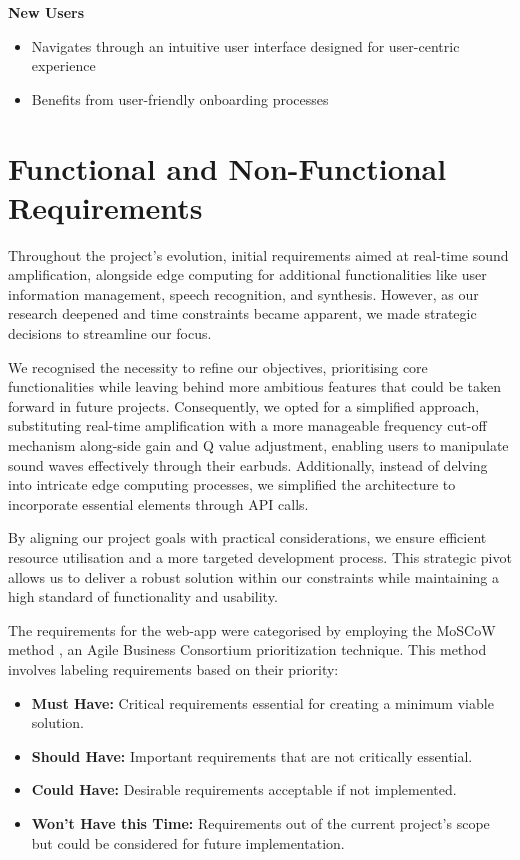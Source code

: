 \documentclass{l4proj}
\begin{document}
\textbf{New Users}
\begin{itemize}
    \item Navigates through an intuitive user interface designed for user-centric experience
    \item Benefits from user-friendly onboarding processes
\end{itemize}

\section{Functional and Non-Functional Requirements}
\label{sec:req}

Throughout the project's evolution, initial requirements aimed at real-time sound amplification, alongside edge computing for additional functionalities like user information management, speech recognition, and synthesis. However, as our research deepened and time constraints became apparent, we made strategic decisions to streamline our focus.

We recognised the necessity to refine our objectives, prioritising core functionalities while leaving behind more ambitious features that could be taken forward in future projects. Consequently, we opted for a simplified approach, substituting real-time amplification with a more manageable frequency cut-off mechanism along-side gain and Q value adjustment, enabling users to manipulate sound waves effectively through their earbuds. Additionally, instead of delving into intricate edge computing processes, we simplified the architecture to incorporate essential elements through API calls.

By aligning our project goals with practical considerations, we ensure efficient resource utilisation and a more targeted development process. This strategic pivot allows us to deliver a robust solution within our constraints while maintaining a high standard of functionality and usability.

The requirements for the web-app were categorised by employing the MoSCoW method \citep{Business}, an Agile Business Consortium prioritization technique. This method involves labeling requirements based on their priority:

\begin{itemize}
    \item \textbf{Must Have:} Critical requirements essential for creating a minimum viable solution.
    \item \textbf{Should Have:} Important requirements that are not critically essential.
    \item \textbf{Could Have:} Desirable requirements acceptable if not implemented.
    \item \textbf{Won’t Have this Time:} Requirements out of the current project's scope but could be considered for future implementation.
\end{itemize}
\end{document}
